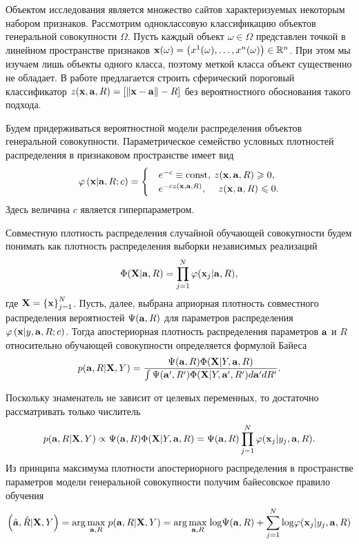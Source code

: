 Объектом исследования является множество сайтов характеризуемых некоторым набором признаков.
Рассмотрим одноклассовую классификацию объектов генеральной совокупности $\Omega$.
Пусть каждый объект $\omega \in{\Omega}$  представлен точкой в линейном пространстве признаков
$\mathbf{x}(\omega)=\left(x^1(\omega),\ldots, x^n(\omega)\right) \in {\mathbb R^n}$. При этом мы изучаем лишь объекты одного класса, поэтому меткой класса объект существенно не обладает. 
В работе \cite{} предлагается строить сферический пороговый классификатор
$z(\mathbf{x},\mathbf{a},R)=\left[\left\|{\mathbf{x}-\mathbf{a}}\right\|-R\right]$ без вероятностного обоснования такого подхода.


Будем придерживаться вероятностной модели распределения объектов генеральной совокупности.
Параметрическое семейство условных плотностей распределения в признаковом пространстве имеет вид 
\begin{equation}
	\label{prob1}
	\varphi \left( {\mathbf{x} | \mathbf{a},R;c} \right) =
		\begin{cases}
			&e^{-c} \equiv \text{const},	  \: z(\mathbf{x},\mathbf{a},R) \geqslant 0, \\
			&e^{-c z(\mathbf{x},\mathbf{a},R)}, \quad\:	z(\mathbf{x},\mathbf{a},R) \leqslant 0.
		\end{cases} 
\end{equation}
Здесь величина $c$ является гиперпараметром.


Совместную плотность распределения случайной обучающей совокупности будем понимать как плотность 
распределения выборки независимых реализаций
$$\Phi(\mathbf{X}|\mathbf{a},R)=\prod \limits_{j=1}^N \varphi(\mathbf{x}_j|\mathbf{a},R),$$ 
где $\mathbf{X}=\left\{\mathbf{x}\right\}_{j=1}^N$.
Пусть, далее, выбрана априорная плотность совместного распределения вероятностей $\Psi(\mathbf{a},R)$ 
для параметров распределения $\varphi \left(\mathbf{x} | y,\mathbf{a},R;c\right)$. Тогда апостериорная
плотность распределения параметров $\mathbf{a}$ и $R$ относительно обучающей совокупности определяется 
формулой Байеса
$$p(\mathbf{a},R|\mathbf{X},Y)
	= \frac {\Psi(\mathbf{a},R) \Phi(\mathbf{X}|Y,\mathbf{a},R)}
			{\int {\Psi(\ensuremath{\mathbf{a}}',R') \Phi(\ensuremath{\mathbf{X}}|Y,\ensuremath{\mathbf{a}}',R')d\ensuremath{\mathbf{a}}'dR'}}.$$

Поскольку знаменатель не зависит от целевых переменных, то достаточно рассматривать только числитель
$$p(\mathbf{a},R|\mathbf{X},Y) \propto \Psi(\mathbf{a},R) \Phi(\mathbf{X}|Y,\mathbf{a},R) = 
\Psi(\mathbf{a},R) \prod \limits_{j=1}^N \varphi(\mathbf{x}_j|y_j,\mathbf{a},R).$$
Из принципа максимума плотности апостериорного распределения в пространстве параметров модели генеральной
 совокупности получим байесовское правило обучения
$$\left(\hat{\mathbf{a}},\hat R|\mathbf{X},Y\right)
	= \arg\underset{\mathbf{a},R}{\max}\; p(\mathbf{a},R|\mathbf{X},Y) 
	= \arg\underset{\mathbf{a},R}{\max}\; {\log}\Psi(\mathbf{a},R) + \sum\limits_{j=1}^N{\log}\varphi(\mathbf{x}_j|y_j,\mathbf{a},R) $$


